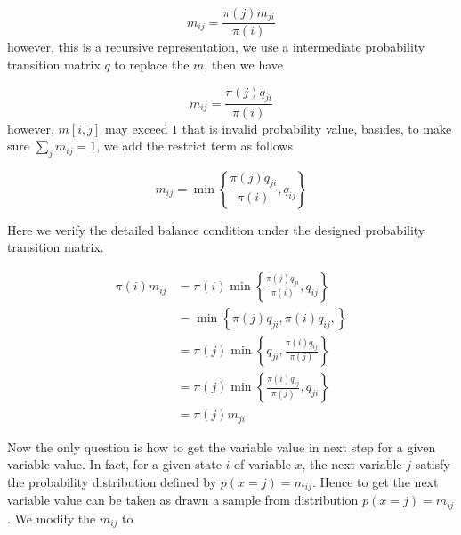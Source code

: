 \documentclass[runningheads,openany]{xhlPaper}
\begin{document}
\begin{displaymath}
{m_{ij}} = \frac{{\pi \left( j \right){m_{ji}}}}{{\pi \left( i \right)}}
\end{displaymath}
however, this is a recursive representation, we use a intermediate probability transition matrix $q$ to replace the $m$, then we have

\begin{displaymath}
{m_{ij}} = \frac{{\pi \left( j \right){q_{ji}}}}{{\pi \left( i \right)}}
\end{displaymath}
however, $m\left[ {i,j} \right]$ may exceed $1$ that is invalid probability value, 
basides, to make sure $\sum\limits_j {{m_{ij}}}  = 1$, we add the restrict term as follows

\begin{displaymath}
{m_{ij}} = \min \left\{ {\frac{{\pi \left( j \right){q_{ji}}}}{{\pi \left( i \right)}},{q_{ij}}} \right\}
\end{displaymath}

Here we verify the detailed balance condition under the designed probability transition matrix.

\begin{displaymath}
\label{equ:metropolis_hastings_sampling_detailed_balance_proof}
\begin{aligned}
\pi \left( i \right){m_{ij}} &= \pi \left( i \right)\min \left\{ {\frac{{\pi \left( j \right){q_{ji}}}}{{\pi \left( i \right)}},{q_{ij}}} \right\}\\
 &= \min \left\{ {\pi \left( j \right){q_{ji}},\pi \left( i \right){q_{ij}},} \right\}\\
 &= \pi \left( j \right)\min \left\{ {{q_{ji}},\frac{{\pi \left( i \right){q_{ij}}}}{{\pi \left( j \right)}}} \right\}\\
 &= \pi \left( j \right)\min \left\{ {\frac{{\pi \left( i \right){q_{ij}}}}{{\pi \left( j \right)}},{q_{ji}}} \right\}\\
 &= \pi \left( j \right){m_{ji}}
\end{aligned}
\end{displaymath}

Now the only question is how to get the variable value in next step for a given variable value. In fact, for a given state $i$ of variable $x$, the next variable $j$ satisfy the probability distribution defined by $p\left( {x = j} \right) = {m_{ij}}$. Hence to get the next variable value can be taken as drawn a sample from distribution $p\left( {x = j} \right) = {m_{ij}}$. 
We modify the $m_{ij}$ to 
\end{document}
